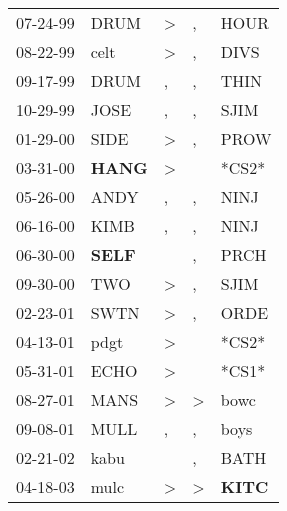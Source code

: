 \begin{supertabular}{p{0.07\textwidth}p{0.06\textwidth}p{0.02\textwidth}p{0.02\textwidth}p{0.06\textwidth}}
 07-24-99\textsuperscript{} &           DRUM\textsuperscript{} &  \textgreater &             , &           HOUR\textsuperscript{} \\
 08-22-99\textsuperscript{} &           celt\textsuperscript{} &  \textgreater &             , &           DIVS\textsuperscript{} \\
 09-17-99\textsuperscript{} &           DRUM\textsuperscript{} &             , &             , &           THIN\textsuperscript{} \\
 10-29-99\textsuperscript{} &           JOSE\textsuperscript{} &             , &             , &           SJIM\textsuperscript{} \\
 01-29-00\textsuperscript{} &           SIDE\textsuperscript{} &  \textgreater &             , &           PROW\textsuperscript{} \\
 03-31-00\textsuperscript{} &  \textbf{HANG\textsuperscript{}} &  \textgreater &               &                            *CS2* \\
 05-26-00\textsuperscript{} &           ANDY\textsuperscript{} &             , &             , &           NINJ\textsuperscript{} \\
 06-16-00\textsuperscript{} &           KIMB\textsuperscript{} &             , &             , &           NINJ\textsuperscript{} \\
 06-30-00\textsuperscript{} &  \textbf{SELF\textsuperscript{}} &               &             , &           PRCH\textsuperscript{} \\
 09-30-00\textsuperscript{} &            TWO\textsuperscript{} &  \textgreater &             , &           SJIM\textsuperscript{} \\
 02-23-01\textsuperscript{} &           SWTN\textsuperscript{} &  \textgreater &             , &           ORDE\textsuperscript{} \\
 04-13-01\textsuperscript{} &           pdgt\textsuperscript{} &  \textgreater &               &                            *CS2* \\
 05-31-01\textsuperscript{} &           ECHO\textsuperscript{} &  \textgreater &               &                            *CS1* \\
 08-27-01\textsuperscript{} &           MANS\textsuperscript{} &  \textgreater &  \textgreater &           bowc\textsuperscript{} \\
 09-08-01\textsuperscript{} &           MULL\textsuperscript{} &             , &             , &           boys\textsuperscript{} \\
 02-21-02\textsuperscript{} &           kabu\textsuperscript{} &               &             , &           BATH\textsuperscript{} \\
 04-18-03\textsuperscript{} &           mulc\textsuperscript{} &  \textgreater &  \textgreater &  \textbf{KITC\textsuperscript{}} \\
\end{supertabular}
